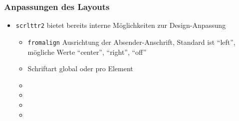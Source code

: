\documentclass[12pt,ngerman]{beamer}
\begin{document}
\begin{frame}
\frametitle{Anpassungen des Layouts}

\begin{itemize}
\item \texttt{scrlttr2} bietet bereits interne Möglichkeiten zur Design-Anpassung
\begin{itemize}
	\item \texttt{fromalign} Ausrichtung der Absender-Anschrift, Standard ist \enquote{left}, mögliche Werte \enquote{center}, \enquote{right}, \enquote{off}
	\item Schriftart global oder pro Element
	\item 
	\item 
	\item 
	\item 
	\end{itemize}
\end{itemize}
\end{frame}
\end{document}

